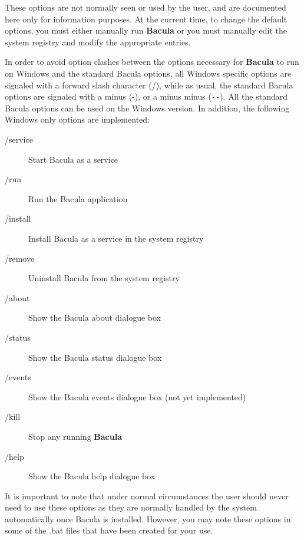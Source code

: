 These options are not normally seen or used by the user, and are documented
here only for information purposes. At the current time, to change the default
options, you must either manually run {\bf Bacula} or you must manually edit
the system registry and modify the appropriate entries. 

In order to avoid option clashes between the options necessary for {\bf
Bacula} to run on Windows and the standard Bacula options, all Windows
specific options are signaled with a forward slash character (/), while as
usual, the standard Bacula options are signaled with a minus (-), or a minus
minus (\verb:--:). All the standard Bacula options can be used on the Windows
version. In addition, the following Windows only options are implemented: 

\begin{description}

\item [/service ]
   Start Bacula as a service 

\item [/run ]
   Run the Bacula application  

\item [/install ]
   Install Bacula as a service in the system registry  

\item [/remove ]
   Uninstall Bacula from the system registry  

\item [/about ]
   Show the Bacula about dialogue box  

\item [/status ]
   Show the Bacula status dialogue box  

\item [/events ]
   Show the Bacula events dialogue box (not  yet implemented)  

\item [/kill ]
   Stop any running {\bf Bacula}  

\item [/help ]
   Show the Bacula help dialogue box 
\end{description}

It is important to note that under normal circumstances the user should never
need to use these options as they are normally handled by the system
automatically once Bacula is installed. However, you may note these options in
some of the .bat files that have been created for your use. 

